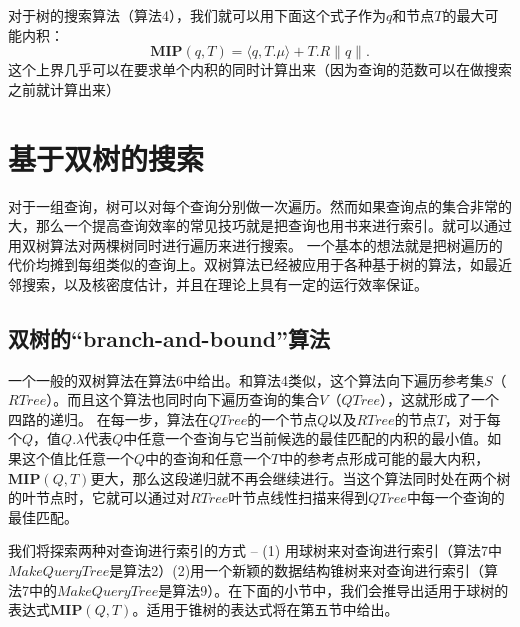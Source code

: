 \documentclass[twocolumn,a4paper]{article}
\begin{document}
对于树的搜索算法（算法4），我们就可以用下面这个式子作为$q$和节点$T$的最大可能内积：
\begin{equation*}
\mathbf{MIP}(q,T) = \langle q,T.\mu\rangle + T.R\|q\|.
\end{equation*}
这个上界几乎可以在要求单个内积的同时计算出来（因为查询的范数可以在做搜索之前就计算出来）

\section{基于双树的搜索}
对于一组查询，树可以对每个查询分别做一次遍历。然而如果查询点的集合非常的大，那么一个提高查询效率的常见技巧就是把查询也用书来进行索引。就可以通过用双树算法对两棵树同时进行遍历来进行搜索。
一个基本的想法就是把树遍历的代价均摊到每组类似的查询上。双树算法已经被应用于各种基于树的算法，如最近邻搜索，以及核密度估计，并且在理论上具有一定的运行效率保证。

\subsection{双树的“branch-and-bound”算法}
一个一般的双树算法在算法6中给出。和算法4类似，这个算法向下遍历参考集$S$（$RTree$）。而且这个算法也同时向下遍历查询的集合$V$（$QTree$），这就形成了一个四路的递归。
在每一步，算法在$QTree$的一个节点$Q$以及$RTree$的节点$T$，对于每个$Q$，值$Q.\lambda$代表$Q$中任意一个查询与它当前候选的最佳匹配的内积的最小值。如果这个值比任意一个$Q$中的查询和任意一个$T$中的参考点形成可能的最大内积，$\mathbf{MIP}(Q,T)$更大，那么这段递归就不再会继续进行。当这个算法同时处在两个树的叶节点时，它就可以通过对$RTree$叶节点线性扫描来得到$QTree$中每一个查询的最佳匹配。

我们将探索两种对查询进行索引的方式 -- (1) 用球树来对查询进行索引（算法7中$MakeQueryTree$是算法2）(2)用一个新颖的数据结构锥树来对查询进行索引（算法7中的$MakeQueryTree$是算法9）。在下面的小节中，我们会推导出适用于球树的表达式$\mathbf{MIP}(Q,T)$。适用于锥树的表达式将在第五节中给出。
\end{document}
